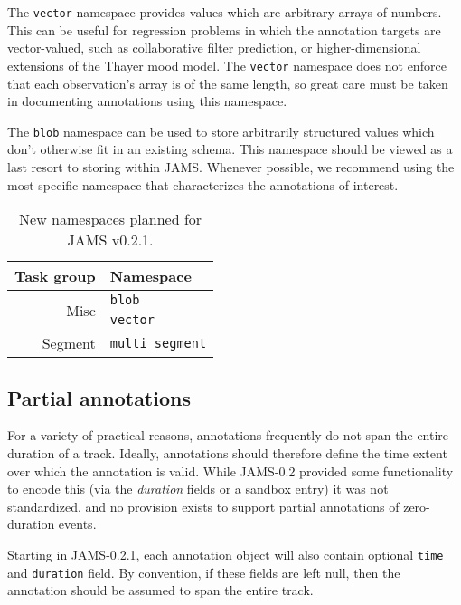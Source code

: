 \documentclass{article}
\begin{document}
The \texttt{vector} namespace provides values which are arbitrary arrays of numbers.
This can be useful for regression problems in which the annotation targets are
vector-valued, such as collaborative filter prediction, or higher-dimensional 
extensions of the Thayer mood model.  The \texttt{vector} namespace does not enforce that
each observation's array is of the same length, so great care must be taken in
documenting annotations using this namespace.

The \texttt{blob} namespace can be used to store arbitrarily structured values which
don't otherwise fit in an existing schema.  This namespace should be viewed as a last
resort to storing within JAMS.  Whenever possible, we recommend using the most specific
namespace that characterizes the annotations of interest.

\begin{table}
    \caption{New namespaces planned for JAMS v0.2.1.}\label{tab:namespaces:0.2.1}
    \centering
    \begin{tabular}{rl}
    \toprule
    Task group                  & Namespace\\
    \midrule
    \multirow{2}{*}{Misc}       & \texttt{blob}\\
                                & \texttt{vector}\\
    Segment                     & \texttt{multi\_segment}\\
    \bottomrule
    \end{tabular}
\end{table}


\subsection{Partial annotations}
For a variety of practical reasons, annotations frequently do not span the entire
duration of a track.  Ideally, annotations should therefore define the time extent over
which the annotation is valid.  While JAMS-0.2 provided some functionality to encode this
(via the \emph{duration} fields or a sandbox entry) it was not standardized, and no
provision exists to support partial annotations of zero-duration events.

Starting in JAMS-0.2.1, each annotation object will also contain optional \texttt{time} and
\texttt{duration} field.  By convention, if these fields are left null, then the
annotation should be assumed to span the entire track.






\end{document}
